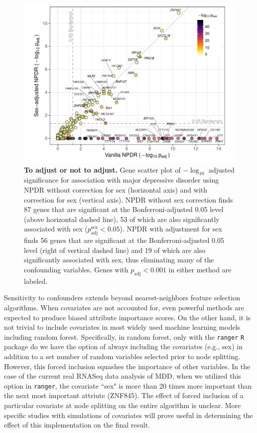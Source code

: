 \documentclass[10pt]{article}
\begin{document}
\begin{figure}[!tpb]%
\centerline{\includegraphics[]{../figs/mostafavi_npdrs_mdd.pdf}}
\caption{{\bf To adjust or not to adjust.}
Gene scatter plot of $-\log_{10}$ adjusted significance for association with major depressive disorder using NPDR without correction for sex (horizontal axis) and with correction for sex (vertical axis). NPDR without sex correction finds 87 genes that are significant at the Bonferroni-adjusted 0.05 level (above horizontal dashed line), 53 of which are also significantly associated with sex ($p^\textrm{sex}_\textrm{adj} < 0.05$).  NPDR with adjustment for sex finds 56 genes that are significant at the Bonferroni-adjusted 0.05 level (right of vertical dashed line) and 19 of which are also significantly associated with sex, thus eliminating many of the confounding variables. Genes with $p_\textrm{adj} < 0.001$ in either method are labeled.}
\label{fig:npdrs_mdd}
\end{figure}

Sensitivity to confounders extends beyond nearest-neighbors feature selection algorithms.
When covariates are not accounted for, even powerful methods are expected to produce biased attribute importance scores.
On the other hand, it is not trivial to include covariates in most widely used machine learning models including random forest.
Specifically, in random forest, only with the \texttt{ranger} \texttt{R} package do we have the option of always including the covariates (e.g., sex) in addition to a set number of random variables selected prior to node splitting.
However, this forced inclusion squashes the importance of other variables.
In the case of the current real RNASeq data analysis of MDD, when we utilized this option in \texttt{ranger}, the covariate ``sex" is more than 20 times more important than the next most important attriute (ZNF845).
The effect of forced inclusion of a particular covariate at node splitting on the entire algorithm is unclear.
More specific studies with simulations of covariates will prove useful in determining the effect of this implementation on the final result.
\end{document}
